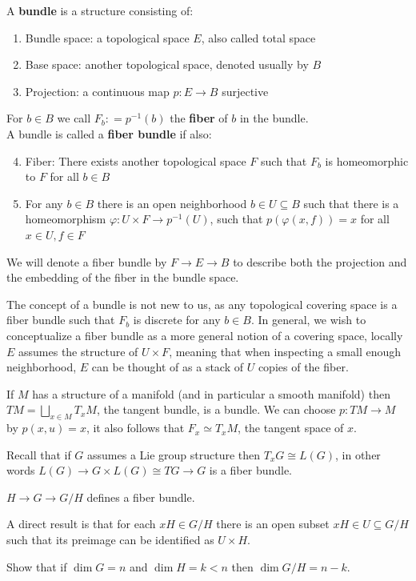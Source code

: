 \begin{definition}[Bundle]
	A \textbf{bundle} is a structure consisting of:
	\begin{enumerate}
		\item Bundle space: a topological space $E$, also called total space
		\item Base space: another topological space, denoted usually by $B$
		\item Projection: a continuous map $p : E \to B$ surjective
	\end{enumerate}
	For $b \in B$ we call $F_b : = p^{-1}(b)$ the \textbf{fiber} of $b$ in the bundle. \\
	A bundle is called a \textbf{fiber bundle} if also:
	\begin{enumerate}
		\setcounter{enumi}{3}
		\item Fiber: There exists another topological space $F$ such that $F_b$ is homeomorphic to $F$ for all $b \in B$
		\item For any $b \in B$ there is an open neighborhood $b \in U \subseteq B$ such that there is a homeomorphism $\varphi : U \times F \to p^{-1}(U)$,
			such that $p(\varphi(x, f)) = x$ for all $x \in U, f \in F$
	\end{enumerate}
\end{definition}
\begin{notation}
	We will denote a fiber bundle by $F \to E \to B$ to describe both the projection and the embedding of the fiber in the bundle space.
\end{notation}
The concept of a bundle is not new to us, as any topological covering space is a fiber bundle such that $F_b$ is discrete for any $b \in B$.
In general, we wish to conceptualize a fiber bundle as a more general notion of a covering space, locally $E$ assumes the structure of $U \times F$,
meaning that when inspecting a small enough neighborhood, $E$ can be thought of as a stack of $U$ copies of the fiber.
\begin{example}
	If $M$ has a structure of a manifold (and in particular a smooth manifold) then $T M = \bigsqcup_{x \in M} T_x M$, the tangent bundle, is a bundle.
	We can choose $p : T M \to M$ by $p(x, u) = x$, it also follows that $F_x \simeq T_x M$, the tangent space of $x$.
\end{example}
Recall that if $G$ assumes a Lie group structure then $T_x G \cong L(G)$, in other words $L(G) \to G \times L(G) \cong T G \to G$ is a fiber bundle.
\begin{proposition}
	$H \to G \to G / H$ defines a fiber bundle.
\end{proposition}
A direct result is that for each $x H \in G / H$ there is an open subset $x H \in U \subseteq G / H$ such that its preimage can be identified as $U \times H$.
\begin{exercise}
	Show that if $\dim G = n$ and $\dim H = k < n$ then $\dim G / H = n - k$.
\end{exercise}



